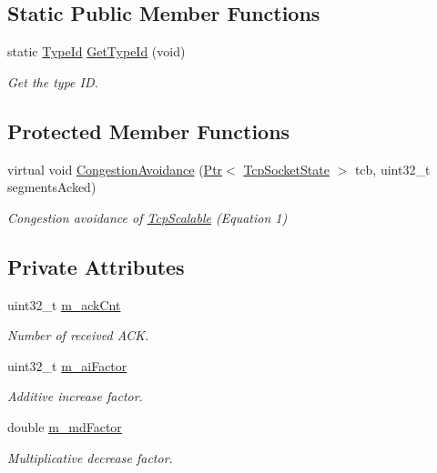 \subsection*{Static Public Member Functions}
\begin{DoxyCompactItemize}
\item 
static \hyperlink{classns3_1_1TypeId}{Type\+Id} \hyperlink{classns3_1_1TcpScalable_a19eebe885cb42a287e38cdd49156e296}{Get\+Type\+Id} (void)
\begin{DoxyCompactList}\small\item\em Get the type ID. \end{DoxyCompactList}\end{DoxyCompactItemize}
\subsection*{Protected Member Functions}
\begin{DoxyCompactItemize}
\item 
virtual void \hyperlink{classns3_1_1TcpScalable_aa0c22097e0628f16f321d79addc58976}{Congestion\+Avoidance} (\hyperlink{classns3_1_1Ptr}{Ptr}$<$ \hyperlink{classns3_1_1TcpSocketState}{Tcp\+Socket\+State} $>$ tcb, uint32\+\_\+t segments\+Acked)
\begin{DoxyCompactList}\small\item\em Congestion avoidance of \hyperlink{classns3_1_1TcpScalable}{Tcp\+Scalable} (Equation 1) \end{DoxyCompactList}\end{DoxyCompactItemize}
\subsection*{Private Attributes}
\begin{DoxyCompactItemize}
\item 
uint32\+\_\+t \hyperlink{classns3_1_1TcpScalable_a61ab84bfbbec1ed78ca9c7b60d9aaa5a}{m\+\_\+ack\+Cnt}
\begin{DoxyCompactList}\small\item\em Number of received A\+CK. \end{DoxyCompactList}\item 
uint32\+\_\+t \hyperlink{classns3_1_1TcpScalable_a850f65ce80a8d0293fe0a3d84b74e69c}{m\+\_\+ai\+Factor}
\begin{DoxyCompactList}\small\item\em Additive increase factor. \end{DoxyCompactList}\item 
double \hyperlink{classns3_1_1TcpScalable_a96c1fea146c632394e7d3150c92ad7b6}{m\+\_\+md\+Factor}
\begin{DoxyCompactList}\small\item\em Multiplicative decrease factor. \end{DoxyCompactList}\end{DoxyCompactItemize}
